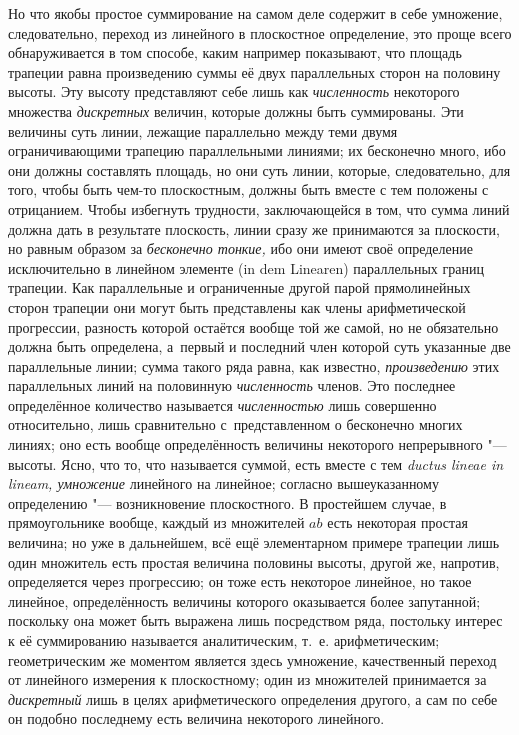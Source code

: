 Но что якобы простое суммирование на самом деле содержит в себе умножение,
следовательно, переход из линейного в плоскостное определение, это проще всего
обнаруживается в том способе, каким например показывают, что площадь трапеции
равна произведению суммы её двух параллельных сторон на половину высоты. Эту
высоту представляют себе лишь как {\em численность} некоторого множества
{\em дискретных} величин, которые должны быть суммированы. Эти величины суть
линии, лежащие параллельно между теми двумя ограничивающими трапецию
параллельными линиями; их бесконечно много, ибо они должны составлять площадь,
но они суть линии, которые, следовательно, для того, чтобы быть чем-то
плоскостным, должны быть вместе с тем положены с отрицанием. Чтобы избегнуть
трудности, заключающейся в том, что сумма линий должна дать в результате
плоскость, линии сразу же принимаются за плоскости, но равным образом за
{\em бесконечно тонкие,} ибо они имеют своё определение исключительно в
линейном элементе (in dem Li\-nea\-ren) параллельных границ трапеции. Как
параллельные и ограниченные другой парой прямолинейных сторон трапеции они
могут быть представлены как члены арифметической прогрессии, разность которой
остаётся вообще той же самой, но не обязательно должна быть определена,
а~первый и последний член которой суть указанные две параллельные линии; сумма
такого ряда равна, как известно, {\em произведению} этих параллельных линий на
половинную {\em численность} членов. Это последнее определённое количество
называется {\em численностью} лишь совершенно относительно, лишь сравнительно
с~представленном о бесконечно многих линиях; оно есть вообще определённость
величины некоторого {непрерывного} "--- высоты. Ясно, что то, что называется
суммой, есть вместе с тем {\em ductus lineae in lineam, умножение}
линейного на линейное; согласно вышеуказанному определению "--- возникновение
плоскостного. В простейшем случае, в прямоугольнике вообще, каждый из
множителей $ab$ есть некоторая простая величина; но уже в дальнейшем, всё ещё
элементарном примере трапеции лишь один множитель есть простая величина
половины высоты, другой же, напротив, определяется через прогрессию; он тоже
есть некоторое линейное, но такое линейное, определённость величины которого
оказывается более запутанной; поскольку она может быть выражена лишь
посредством ряда, постольку интерес к её суммированию называется аналитическим,
т.~е. арифметическим; геометрическим же моментом является здесь умножение,
качественный переход от линейного измерения к плоскостному; один из
множителей принимается за {\em дискретный} лишь в целях
арифметического определения другого, а сам по себе он
подобно последнему есть величина некоторого линейного.

